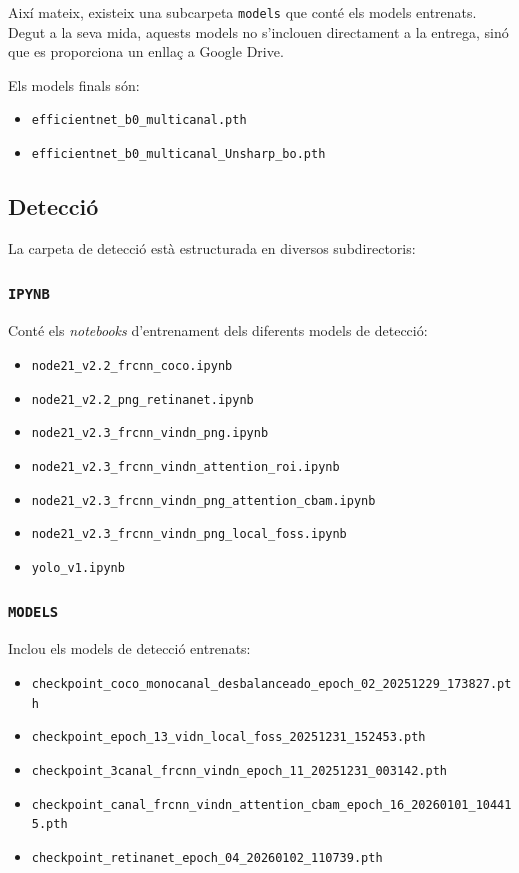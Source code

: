 \documentclass[11pt,a4paper]{article}
\begin{document}
Així mateix, existeix una subcarpeta \texttt{models} que conté els models
entrenats. Degut a la seva mida, aquests models no s’inclouen directament a la
entrega, sinó que es proporciona un enllaç a Google Drive.

Els models finals són:
\begin{itemize}
    \item \texttt{efficientnet\_b0\_multicanal.pth}
    \item \texttt{efficientnet\_b0\_multicanal\_Unsharp\_bo.pth}
\end{itemize}

\subsection{Detecció}

La carpeta de detecció està estructurada en diversos subdirectoris:

\subsubsection{\texttt{IPYNB}}

Conté els \textit{notebooks} d’entrenament dels diferents models de detecció:

\begin{itemize}
    \item \texttt{node21\_v2.2\_frcnn\_coco.ipynb}
    \item \texttt{node21\_v2.2\_png\_retinanet.ipynb}
    \item \texttt{node21\_v2.3\_frcnn\_vindn\_png.ipynb}
    \item \texttt{node21\_v2.3\_frcnn\_vindn\_attention\_roi.ipynb}
    \item \texttt{node21\_v2.3\_frcnn\_vindn\_png\_attention\_cbam.ipynb}
    \item \texttt{node21\_v2.3\_frcnn\_vindn\_png\_local\_foss.ipynb}
    \item \texttt{yolo\_v1.ipynb}
\end{itemize}

\subsubsection{\texttt{MODELS}}

Inclou els models de detecció entrenats:

\begin{itemize}
    \item \texttt{checkpoint\_coco\_monocanal\_desbalanceado\_epoch\_02\_20251229\_173827.pth}
    \item \texttt{checkpoint\_epoch\_13\_vidn\_local\_foss\_20251231\_152453.pth}
    \item \texttt{checkpoint\_3canal\_frcnn\_vindn\_epoch\_11\_20251231\_003142.pth}
    \item \texttt{checkpoint\_canal\_frcnn\_vindn\_attention\_cbam\_epoch\_16\_20260101\_104415.pth}
    \item \texttt{checkpoint\_retinanet\_epoch\_04\_20260102\_110739.pth}
\end{itemize}
\end{document}
